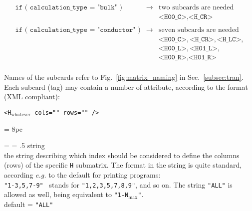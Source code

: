 %
%
\begin{displaymath}
\begin{array}{lll}
\texttt{if ( calculation\_type = "bulk" )}         & \rightarrow & 
                                                     \textrm{two subcards are needed}\\
\texttt{}                                          & \texttt{}   & 
                                                     \texttt{<H00\_C>},\texttt{<H\_CR>}\\
\texttt{}                                          & \texttt{}   & \textbf{}\\
\texttt{if ( calculation\_type = "conductor" )}    & \rightarrow & 
                                                     \textrm{seven subcards are needed}\\

\texttt{}                                          & \texttt{}   & 
                                                     \texttt{<H00\_C>},
                                                     \texttt{<H\_CR>},\texttt{<H\_LC>},\\
\texttt{}                                          & \texttt{}   & 
                                                     \texttt{<H00\_L>},\texttt{<H01\_L>},\\
\texttt{}                                          & \texttt{}   & 
                                                     \texttt{<H00\_R>}, \texttt{<H01\_R>}\\
\end{array}
\end{displaymath}
%
%

\noindent Names of the subcards refer to Fig.~\ref{fig:matrix_naming} in 
Sec.~\ref{subsec:tran}. 
Each subcard (tag) may contain a number of attribute, according to the 
format (XML compliant):
%
%
\begin{description}
\item
   {\tt <H$_{\text{whatever}}$  cols=""  rows=""  />}
\end{description}
%
%


\newdimen\descindent \descindent = 8pc
{\noindent \leftskip = \descindent \parskip = .5\baselineskip
{}%
{\sc string} \\
the string describing which index should be considered to define the 
columns (rows) of the specific {\tt H} submatrix.
The format in the string is quite standard, according {\it e.g.} to the default
for printing programs: \\
{\tt  "1-3,5,7-9" } stands for {\tt "1,2,3,5,7,8,9"}, and so on.
The string {\tt "ALL"} is allowed as well, being equivalent to
{\tt "1-N$_{\text{max}}$"}. \\
{\sc default} = {\tt "ALL"} \par

}

